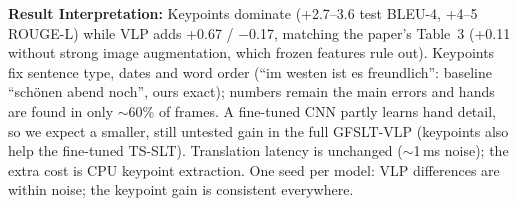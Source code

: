 \documentclass[8pt,a4paper]{article}
\begin{document}
\vspace{-5pt}

\textbf{Result Interpretation:}
Keypoints dominate (+2.7--3.6 test BLEU-4, +4--5 ROUGE-L) while VLP adds +0.67 / $-$0.17, matching the paper's Table~3 (+0.11 without strong image augmentation, which frozen features rule out). Keypoints fix sentence type, dates and word order (``im westen ist es freundlich'': baseline ``sch\"onen abend noch'', ours exact); numbers remain the main errors and hands are found in only ${\sim}$60\% of frames. A fine-tuned CNN partly learns hand detail, so we expect a smaller, still untested gain in the full GFSLT-VLP (keypoints also help the fine-tuned TS-SLT). Translation latency is unchanged (${\sim}$1\,ms noise); the extra cost is CPU keypoint extraction. One seed per model: VLP differences are within noise; the keypoint gain is consistent everywhere.
\end{document}
